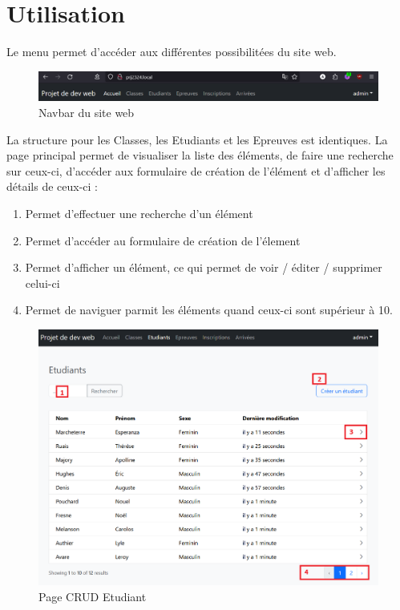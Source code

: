 \newpage
\section{Utilisation}

Le menu permet d'accéder aux différentes possibilitées du site web.

\begin{figure}[H]
	\centering
	\includegraphics[keepaspectratio,width=15cm]{images/Emploi3}
	\caption{Navbar du site web}
\end{figure}

La structure pour les Classes, les Etudiants et les Epreuves est identiques. La page principal permet de visualiser la liste des éléments, de faire une recherche sur ceux-ci, d'accéder aux formulaire de création de l'élément et d'afficher les détails de ceux-ci :

\begin{enumerate}
	\item Permet d'effectuer une recherche d'un élément
	\item Permet d'accéder au formulaire de création de l'élement
	\item Permet d'afficher un élément, ce qui permet de voir / éditer / supprimer celui-ci
	\item Permet de naviguer parmit les éléments quand ceux-ci sont supérieur à 10.
\end{enumerate}

\begin{figure}[H]
	\centering
	\includegraphics[keepaspectratio,width=12cm]{images/Emploi4}
	\caption{Page CRUD Etudiant}
\end{figure}

